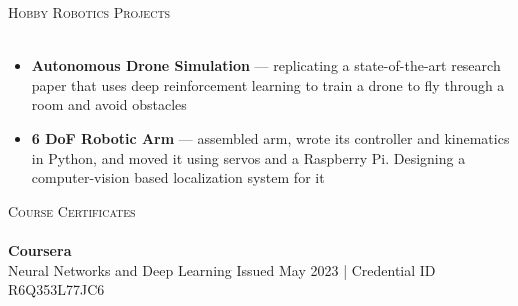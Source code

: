 \documentclass[a4paper]{article}
\newcommand{\lineunder} {
    \vspace*{-8pt} \\
    \hspace*{-18pt} \hrulefill \\
}
\newcommand{\header} [1] {
    {\hspace*{-18pt}\vspace*{6pt} \textsc{#1}}
    \vspace*{-6pt} \lineunder
}
\begin{document}
\header{Hobby Robotics Projects}
\vspace{-1mm}
\begin{itemize} \itemsep 1pt
    \item \textbf{Autonomous Drone Simulation} --- replicating a state-of-the-art research paper that uses deep reinforcement
    learning to train a drone to fly through a room and avoid obstacles
    \item \textbf{6 DoF Robotic Arm} --- assembled arm, wrote its controller and kinematics in Python, and moved it using servos and a Raspberry Pi. Designing a computer-vision based localization system for it
\end{itemize}

\header{Course Certificates}
{\textbf{Coursera}}\\
\vspace{1.75mm}
Neural Networks and Deep Learning \hfill Issued May 2023 | \footnotesize{Credential ID R6Q353L77JC6}
\end{document}
